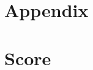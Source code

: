 

\section{Appendix}
\begin{center}
\fancyhf{} %
\renewcommand{\headrulewidth}{0pt} %
\rfoot{\thepage}
\pagestyle{plain}
\begin{center}
 
    \clearpage\mbox{}\clearpage
\end{center}
\end{center}


\section{Score}
\begin{center}
\fancyhf{} %
\renewcommand{\headrulewidth}{0pt} %
\rfoot{\thepage}
\pagestyle{plain}
\begin{center}

\pagebreak

 
\end{center}
\end{center}



